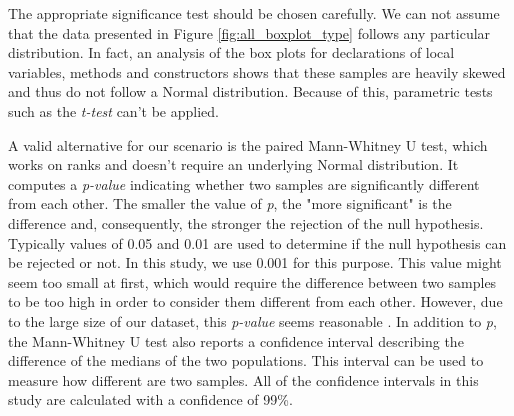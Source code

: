 \documentclass[preprint]{sigplanconf}
\begin{document}
The appropriate significance test should be chosen carefully.
We can not assume that the data presented in Figure \ref{fig:all_boxplot_type} follows any particular distribution.
In fact, an analysis of the box plots for declarations of local variables, methods and constructors shows that these samples are heavily skewed and thus do not follow a Normal distribution.
Because of this, parametric tests such as the \emph{t-test} can't be applied.

A valid alternative for our scenario is the paired Mann-Whitney U test, which works on ranks and doesn't require an underlying Normal distribution.
It computes a \emph{p-value} indicating whether two samples are significantly different from each other.
The smaller the value of \emph{p}, the "more significant" is the difference and, consequently, the stronger the rejection of the null hypothesis.
Typically values of 0.05 and 0.01 are used to determine if the null hypothesis can be rejected or not.
In this study, we use 0.001 for this purpose.
This value might seem too small at first, which would require the difference between two samples to be too high in order to consider them different from each other.
However, due to the large size of our dataset, this \emph{p-value} seems reasonable \cite{labovitz68}.
In addition to \emph{p}, the Mann-Whitney U test also reports a confidence interval describing the difference of the medians of the two  populations.
This interval can be used to measure how different are two samples.
All of the confidence intervals in this study are calculated with a confidence of 99\%.

\end{document}
